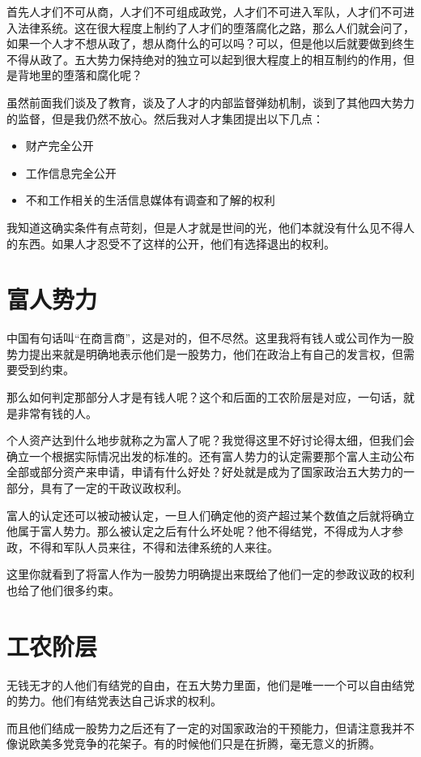 \documentclass[11pt,oneside]{article}
\begin{document}
\begin{common-format}
首先人才们不可从商，人才们不可组成政党，人才们不可进入军队，人才们不可进入法律系统。这在很大程度上制约了人才们的堕落腐化之路，那么人们就会问了，如果一个人才不想从政了，想从商什么的可以吗？可以，但是他以后就要做到终生不得从政了。五大势力保持绝对的独立可以起到很大程度上的相互制约的作用，但是背地里的堕落和腐化呢？

虽然前面我们谈及了教育，谈及了人才的内部监督弹劾机制，谈到了其他四大势力的监督，但是我仍然不放心。然后我对人才集团提出以下几点：
\begin{itemize}
\item 财产完全公开
\item 工作信息完全公开
\item 不和工作相关的生活信息媒体有调查和了解的权利
\end{itemize}

我知道这确实条件有点苛刻，但是人才就是世间的光，他们本就没有什么见不得人的东西。如果人才忍受不了这样的公开，他们有选择退出的权利。


\section{富人势力}
中国有句话叫“在商言商”，这是对的，但不尽然。这里我将有钱人或公司作为一股势力提出来就是明确地表示他们是一股势力，他们在政治上有自己的发言权，但需要受到约束。

那么如何判定那部分人才是有钱人呢？这个和后面的工农阶层是对应，一句话，就是非常有钱的人。

个人资产达到什么地步就称之为富人了呢？我觉得这里不好讨论得太细，但我们会确立一个根据实际情况出发的标准的。还有富人势力的认定需要那个富人主动公布全部或部分资产来申请，申请有什么好处？好处就是成为了国家政治五大势力的一部分，具有了一定的干政议政权利。

富人的认定还可以被动被认定，一旦人们确定他的资产超过某个数值之后就将确立他属于富人势力。那么被认定之后有什么坏处呢？他不得结党，不得成为人才参政，不得和军队人员来往，不得和法律系统的人来往。

这里你就看到了将富人作为一股势力明确提出来既给了他们一定的参政议政的权利也给了他们很多约束。


\section{工农阶层}
无钱无才的人他们有结党的自由，在五大势力里面，他们是唯一一个可以自由结党的势力。他们有结党表达自己诉求的权利。

而且他们结成一股势力之后还有了一定的对国家政治的干预能力，但请注意我并不像说欧美多党竞争的花架子。有的时候他们只是在折腾，毫无意义的折腾。


\end{common-format}
\end{document}
